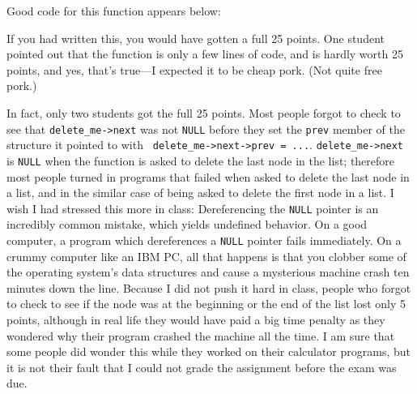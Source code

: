 Good code for this function appears below:

\begin{flushleft}
\verb% void delete_node(struct node *delete_me)% \\*
\verb% {% \\*
\verb%   if (delete_me->next)% \\*
\verb%     delete_me->next->prev = delete_me->prev;% \\*
\verb% % \\*
\verb%   if (delete_me->prev)% \\*
\verb%     delete_me->prev->next = delete_me->next;% \\*
\verb% % \\*
\verb%   free(delete_me);% \\*
\verb% }% 
\end{flushleft}

If you had written this, you would have gotten a full 25 points.  One
student pointed out that the function is only a few lines of code, and
is hardly worth 25 points, and yes, that's true---I expected it to be
cheap pork.  (Not quite free pork.)

In fact, only two students got the full 25 points.  Most people forgot
to check to see that {\tt delete\_me->next} was not {\tt NULL} before
they set the {\tt prev} member of the structure it pointed to with {\tt
delete\_me->next->prev = ...}.  {\tt delete\_me->next} is {\tt NULL}
when the function is asked to delete the last node in the list;
therefore most people turned in programs that failed when asked to
delete the last node in a list, and in the similar case of being asked
to delete the first node in a list.  I wish I had stressed this more in
class: Dereferencing the {\tt NULL} pointer is an incredibly common
mistake, which yields undefined behavior.  On a good computer, a program
which dereferences a {\tt NULL} pointer fails immediately.  On a crummy
computer like an IBM PC, all that happens is that you clobber some of
the operating system's data structures and cause a mysterious machine
crash ten minutes down the line.  Because I did not push it hard in
class, people who forgot to check to see if the node was at the
beginning or the end of the list lost only 5 points, although in real
life they would have paid a big time penalty as they wondered why their
program crashed the machine all the time.  I am sure that some people
did wonder this while they worked on their calculator programs, but it
is not their fault that I could not grade the assignment before the
exam was due.

